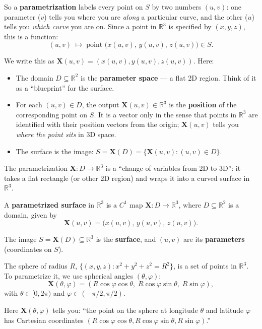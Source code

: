 \documentclass[11pt]{report}
\newcommand{\R}{\mathbb{R}}
\begin{document}
So a \textbf{parametrization} labels every point on $S$ by two numbers $(u,v)$: one parameter ($v$) tells you where you are \textit{along} a particular curve, and the other ($u$) tells you \textit{which curve} you are on. Since a point in $\R^3$ is specified by $(x,y,z)$, this is a function:
\[
(u, v) \;\mapsto\; \text{point } \big( x(u,v), \, y(u,v), \, z(u,v) \big) \in S.
\]

We write this as $\mathbf{X}(u,v) = (x(u,v), y(u,v), z(u,v))$. Here:
\begin{itemize}
    \item The domain $D \subseteq \R^2$ is the \textbf{parameter space} --- a flat 2D region. Think of it as a ``blueprint'' for the surface.
    \item For each $(u,v) \in D$, the output $\mathbf{X}(u,v) \in \R^3$ is the \textbf{position} of the corresponding point on $S$. It is a vector only in the sense that points in $\R^3$ are identified with their position vectors from the origin; $\mathbf{X}(u,v)$ tells you \textit{where the point sits} in 3D space.
    \item The surface is the image: $S = \mathbf{X}(D) = \{\mathbf{X}(u,v) : (u,v) \in D\}$.
\end{itemize}

The parametrization $\mathbf{X}: D \to \R^3$ is a ``change of variables from 2D to 3D'': it takes a flat rectangle (or other 2D region) and wraps it into a curved surface in $\R^3$.

\begin{definition}
A \textbf{parametrized surface} in $\R^3$ is a $C^1$ map $\mathbf{X}: D \to \R^3$, where $D \subseteq \R^2$ is a domain, given by
\[
\mathbf{X}(u, v) = \big( x(u,v), \, y(u,v), \, z(u,v) \big).
\]

The image $S = \mathbf{X}(D) \subseteq \R^3$ is the \textbf{surface}, and $(u,v)$ are its \textbf{parameters} (coordinates on $S$).
\end{definition}

\begin{example}[Sphere]
The sphere of radius $R$, $\{(x,y,z) : x^2 + y^2 + z^2 = R^2\}$, is a set of points in $\R^3$. To parametrize it, we use spherical angles $(\theta, \varphi)$:
\[
\mathbf{X}(\theta, \varphi) = (R\cos\varphi\cos\theta, \; R\cos\varphi\sin\theta, \; R\sin\varphi),
\]
with $\theta \in [0, 2\pi)$ and $\varphi \in (-\pi/2, \pi/2)$.

Here $\mathbf{X}(\theta, \varphi)$ tells you: ``the point on the sphere at longitude $\theta$ and latitude $\varphi$ has Cartesian coordinates $(R\cos\varphi\cos\theta, R\cos\varphi\sin\theta, R\sin\varphi)$.''
\end{example}
\end{document}
